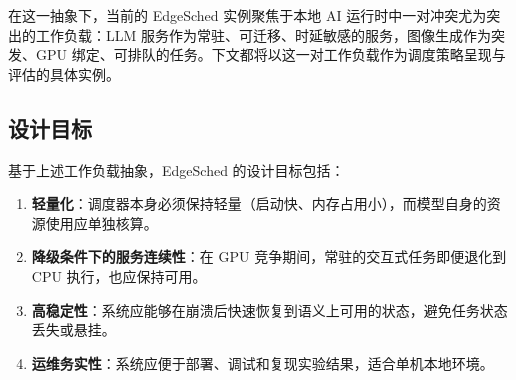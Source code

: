 在这一抽象下，当前的 EdgeSched 实例聚焦于本地 AI 运行时中一对冲突尤为突出的工作负载：LLM 服务作为常驻、可迁移、时延敏感的服务，图像生成作为突发、GPU 绑定、可排队的任务。下文都将以这一对工作负载作为调度策略呈现与评估的具体实例。

\subsection{设计目标}

基于上述工作负载抽象，EdgeSched 的设计目标包括：

\begin{enumerate}
\item \textbf{轻量化}：调度器本身必须保持轻量（启动快、内存占用小），而模型自身的资源使用应单独核算。
\item \textbf{降级条件下的服务连续性}：在 GPU 竞争期间，常驻的交互式任务即便退化到 CPU 执行，也应保持可用。
\item \textbf{高稳定性}：系统应能够在崩溃后快速恢复到语义上可用的状态，避免任务状态丢失或悬挂。
\item \textbf{运维务实性}：系统应便于部署、调试和复现实验结果，适合单机本地环境。
\end{enumerate}